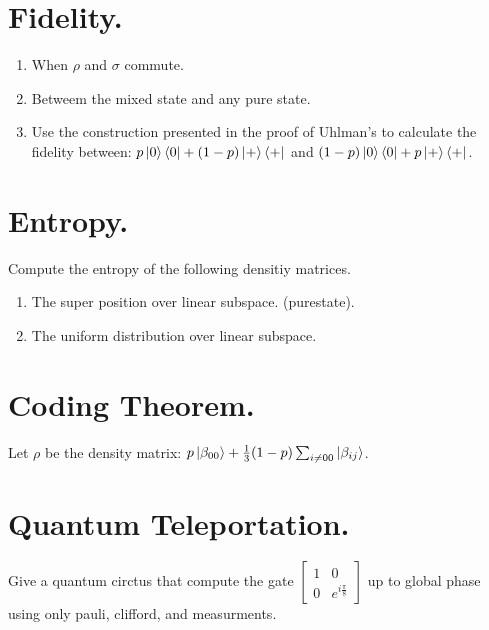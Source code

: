 \documentclass[12pt,a4paper]{article}
\begin{document}
\section{Fidelity.}
\begin{enumerate}
  \item When $\rho$ and $\sigma$ commute. 
  \item Betweem the mixed state and any pure state.  
  \item Use the construction presented in the proof of Uhlman's to calculate the fidelity between: $p\ket{0}\bra{0} + (1-p)\ket{+}\bra{+}$  and $(1-p)\ket{0}\bra{0} + p\ket{+}\bra{+}$. 
\end{enumerate}

\section{Entropy.}
Compute the entropy of the following densitiy matrices. 
\begin{enumerate}
  \item The super position over linear subspace. (purestate). 
  \item The uniform distribution over linear subspace.
   
\end{enumerate}


\section{Coding Theorem.} 
Let $\rho$ be the density matrix: $p \ket{\beta_{00}} + \frac{1}{3}(1-p)\sum_{i \neq 00}{\ket{\beta_{ij}}}$.
\section{Quantum Teleportation.}
Give a quantum circtus that compute the gate $\begin{bmatrix} 1 & 0 \\ 0 &  e^{i\frac{\pi}{8}} \end{bmatrix} $ up to global phase using only pauli, clifford, and measurments. 

\printbibliography 
\end{document}
